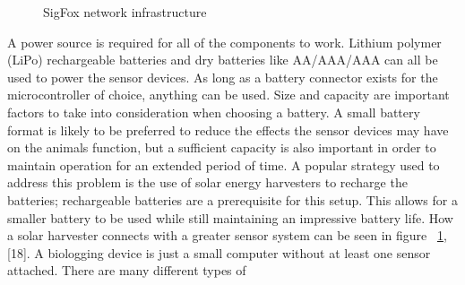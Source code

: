\documentclass[sigplan,screen,nonacm]{acmart}
\begin{document}
\begin{figure}[htbp]
  \centering
  \caption{SigFox network infrastructure\cite{wild2023internet}}
  \label{fig:WildFi_microcontroller}
\end{figure}
A power source is required for all of the components to work. Lithium polymer (LiPo) rechargeable batteries and 
dry batteries like AA/AAA/AAA can all be used to power the sensor devices. As long as a battery connector exists 
for the microcontroller of choice, anything can be used. Size and capacity are important factors to take into 
consideration when choosing a battery. A small battery format is likely to be preferred to reduce the effects the 
sensor devices may have on the animals function, but a sufficient capacity is also important in order to maintain 
operation for an extended period of time. A popular strategy used to address this problem is the use of solar 
energy harvesters to recharge the batteries; rechargeable batteries are a prerequisite for this setup. This allows 
for a smaller battery to be used while still maintaining an impressive battery life. How a solar harvester connects 
with a greater sensor system can be seen in figure ~\ref{fig:WildFi_microcontroller}, [18].
A biologging device is just a small computer without at least one sensor attached. There are many different types of 
\end{document}
